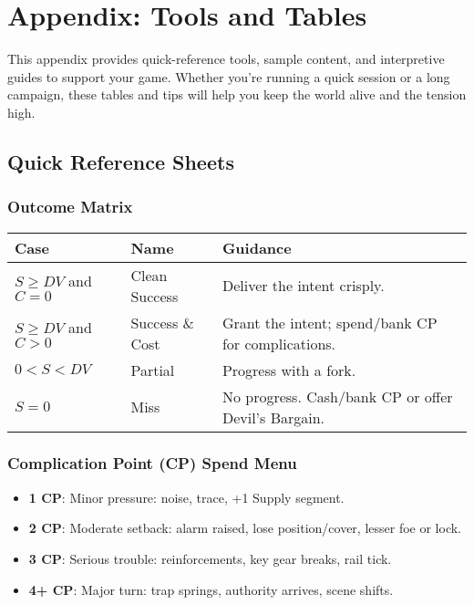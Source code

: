 \chapter{Appendix: Tools and Tables}

This appendix provides quick-reference tools, sample content, and interpretive guides to support your game. Whether you're running a quick session or a long campaign, these tables and tips will help you keep the world alive and the tension high.

\section*{Quick Reference Sheets}

\subsection*{Outcome Matrix}

\begin{center}
\begin{tabular}{lll}
\toprule
\textbf{Case} & \textbf{Name} & \textbf{Guidance} \\
\midrule
$S \geq DV$ and $C = 0$ & Clean Success\index{Clean Success} & Deliver the intent crisply. \\
$S \geq DV$ and $C > 0$ & Success \& Cost\index{Success \& Cost} & Grant the intent; spend/bank CP for complications. \\
$0 < S < DV$ & Partial\index{Partial} & Progress with a fork. \\
$S = 0$ & Miss\index{Miss} & No progress. Cash/bank CP or offer Devil's Bargain\index{Devil's Bargain}. \\
\bottomrule
\end{tabular}
\end{center}

\subsection*{Complication Point (CP) Spend Menu}

\begin{itemize}
    \item \textbf{1 CP}: Minor pressure: noise, trace, +1 Supply segment.
    \item \textbf{2 CP}: Moderate setback: alarm raised, lose position/cover, lesser foe or lock.
    \item \textbf{3 CP}: Serious trouble: reinforcements, key gear breaks, rail tick.
    \item \textbf{4+ CP}: Major turn: trap springs, authority arrives, scene shifts.
\end{itemize}

